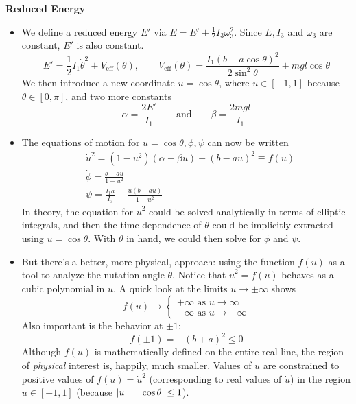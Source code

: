 \documentclass[11pt, a4paper]{article}
\newcommand{\eqtext}[1]{\qquad \text{#1} \qquad}
\newcommand{\veff}{V_{\text{eff}}}  %
\begin{document}
\textbf{Reduced Energy}
\begin{itemize}
	\item  We define a reduced energy $ E' $ via $ E = E' + \frac{1}{2}I_3 \omega_3^2 $. Since $ E, I_3 $ and $ \omega_3 $ are constant, $ E' $ is also constant.
	\begin{equation*}
		E' = \frac{1}{2}I_1 \dot{\theta}^2 + \veff(\theta), \qquad \veff(\theta) = \frac{I_1(b-a\cos \theta)^2}{2\sin^2 \theta} + mgl\cos \theta
	\end{equation*}
	We then introduce a new coordinate $ u = \cos \theta $, where $ u \in [-1, 1] $ because $ \theta \in [0, \pi] $, and two more constants
	\begin{equation*}
		\alpha = \frac{2 E'}{I_1} \eqtext{and} \beta = \frac{2mgl}{I_1}
	\end{equation*}
	
	\item The equations of motion for $ u = \cos \theta, \phi, \psi $ can now be written
	\begin{align*}
		& \dot{u}^2  = (1-u^{2})(\alpha - \beta u) - (b - a u)^2 \equiv f(u)\\
		&\dot{\phi} = \frac{b-au}{1-u^2}\\
		&\dot{\psi} = \frac{I_1a}{I_3} - \frac{u(b-au)}{1-u^2}
	\end{align*}
	In theory, the equation for $ \dot{u}^{2} $ could be solved analytically in terms of elliptic integrals, and then the time dependence of $ \theta $ could be implicitly extracted using $ u = \cos \theta $. With $ \theta $ in hand, we could then solve for $ \phi $ and $ \psi $.
	
	\item But there's a better, more physical, approach: using the function $ f(u) $ as a tool to analyze the nutation angle $ \theta $. Notice that $ \dot{u}^{2} = f(u) $ behaves as a cubic polynomial in $ u $. A quick look at the limits $ u \to \pm \infty $ shows 
	\begin{equation*}
		f(u) \to 
		\begin{cases}
			+ \infty \text{ as } u \to \infty\\
			- \infty \text{ as } u \to -\infty
		\end{cases}
	\end{equation*}
	Also important is the behavior at $ \pm 1 $:
	\begin{equation*}
		f(\pm 1) = - (b \mp a)^{2} \leq 0
	\end{equation*}
	Although $ f(u) $ is mathematically defined on the entire real line, the region of \textit{physical} interest is, happily, much smaller. Values of $ u $ are constrained to positive values of $ f(u) = \dot{u}^2 $ (corresponding to real values of $ \dot{u} $) in the region $ u \in [-1, 1] $ (because $ \abs{u} = \abs{\cos \theta} \leq 1$). 
	

\end{itemize}
\end{document}
